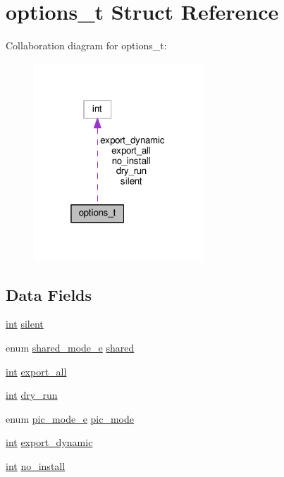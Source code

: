 \hypertarget{structoptions__t}{}\section{options\+\_\+t Struct Reference}
\label{structoptions__t}


Collaboration diagram for options\+\_\+t\+:
\nopagebreak
\begin{figure}[H]
\begin{center}
\leavevmode
\includegraphics[width=181pt]{structoptions__t__coll__graph}
\end{center}
\end{figure}
\subsection*{Data Fields}
\begin{DoxyCompactItemize}
\item 
\hyperlink{pcre_8txt_a42dfa4ff673c82d8efe7144098fbc198}{int} \hyperlink{structoptions__t_a4003119916f574a1f52bcd8d9373e989}{silent}
\item 
enum \hyperlink{jlibtool_8c_a1856ee0ca4f47c05fd68b88cadaab1b7}{shared\+\_\+mode\+\_\+e} \hyperlink{structoptions__t_ada7e7fabb6fa763bb613576b005d9ebb}{shared}
\item 
\hyperlink{pcre_8txt_a42dfa4ff673c82d8efe7144098fbc198}{int} \hyperlink{structoptions__t_ae55377513b239904f00b9d96c056ef32}{export\+\_\+all}
\item 
\hyperlink{pcre_8txt_a42dfa4ff673c82d8efe7144098fbc198}{int} \hyperlink{structoptions__t_aaa396db773355addeefffab83395c627}{dry\+\_\+run}
\item 
enum \hyperlink{jlibtool_8c_ad545e201a345fc3d693e387abe3185e7}{pic\+\_\+mode\+\_\+e} \hyperlink{structoptions__t_aed4211854d35e2c2d37a59f59f5d7add}{pic\+\_\+mode}
\item 
\hyperlink{pcre_8txt_a42dfa4ff673c82d8efe7144098fbc198}{int} \hyperlink{structoptions__t_a7a7049a86168876f7c948f48bb5c39a2}{export\+\_\+dynamic}
\item 
\hyperlink{pcre_8txt_a42dfa4ff673c82d8efe7144098fbc198}{int} \hyperlink{structoptions__t_a90eefacc16c51e3b259580633858f430}{no\+\_\+install}
\end{DoxyCompactItemize}


